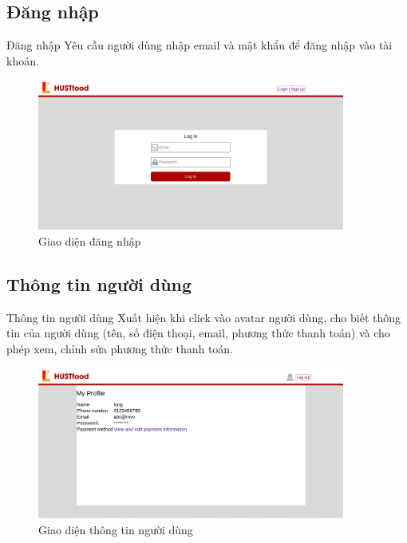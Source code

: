 \documentclass[aspectratio=43,xcolor=dvipsnames]{beamer}
\begin{document}
	\subsection{Đăng nhập}
	\begin{frame}{Đăng nhập}
	Yêu cầu người dùng nhập email và mật khẩu để đăng nhập vào tài khoản.
		\begin{figure}[ht!]
			\centerline{\includegraphics[width=0.9\textwidth]{web-image/dangnhap.png}}
			\caption{Giao diện đăng nhập}
			\label{fig:ass1}
		\end{figure}
	\end{frame}
	\subsection{Thông tin người dùng}
	\begin{frame}{Thông tin người dùng}
	Xuất hiện khi click vào avatar người dùng, cho biết thông tin của người dùng (tên, số điện thoại, email, phương thức thanh toán) và cho phép xem, chỉnh sửa phương thức thanh toán.
		\begin{figure}[ht!]
			\centerline{\includegraphics[width=0.9\textwidth]{web-image/ttnguoidung.png}}
			\caption{Giao diện thông tin người dùng}
			\label{fig:ass1}
		\end{figure}
	\end{frame}
\end{document}
